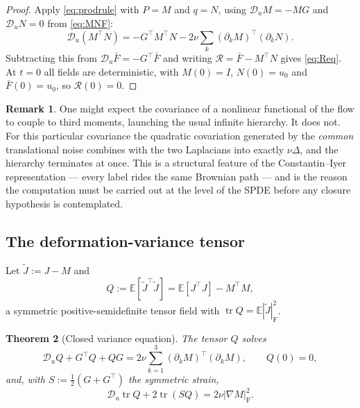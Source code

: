 \documentclass[11pt,reqno]{amsart}
\newcommand{\E}{\mathbb{E}}
\newcommand{\abs}[1]{\left\lvert #1\right\rvert}
\DeclareMathOperator{\tr}{tr}
\newtheorem{theorem}{Theorem}[section]
\theoremstyle{definition}
\newtheorem{remark}[theorem]{Remark}
\begin{document}
\begin{proof}
Apply \eqref{eq:prodrule} with $P=M$ and $q=N$, using $\mathcal D_uM=-MG$ and
$\mathcal D_uN=0$ from \eqref{eq:MNF}:
\[
  \mathcal D_u(M^\top N)=-G^\top M^\top N-2\nu\sum_k(\partial_kM)^\top(\partial_kN).
\]
Subtracting this from $\mathcal D_u\bar F=-G^\top\bar F$ and writing
$\mathcal R=\bar F-M^\top N$ gives \eqref{eq:Req}. At $t=0$ all fields are deterministic,
with $M(0)=I$, $N(0)=u_0$ and $\bar F(0)=u_0$, so $\mathcal R(0)=0$.
\end{proof}

\begin{remark}
One might expect the covariance of a nonlinear functional of the flow to couple to third
moments, launching the usual infinite hierarchy. It does not. For this particular
covariance the quadratic covariation generated by the \emph{common} translational noise
combines with the two Laplacians into exactly $\nu\Delta$, and the hierarchy terminates at
once. This is a structural feature of the Constantin--Iyer representation --- every label
rides the same Brownian path --- and is the reason the computation must be carried out at
the level of the SPDE before any closure hypothesis is contemplated.
\end{remark}

\subsection{The deformation-variance tensor}

Let $\widetilde J:=J-M$ and
\begin{equation}\label{eq:Qdef}
  Q:=\E[\widetilde J^\top\widetilde J]=\E[J^\top J]-M^\top M,
\end{equation}
a symmetric positive-semidefinite tensor field with
$\tr Q=\E\abs{\widetilde J}_{\mathrm F}^2$.

\begin{theorem}[Closed variance equation]\label{thm:Qeq}
The tensor $Q$ solves
\begin{equation}\label{eq:Qeq}
  \mathcal D_uQ+G^\top Q+QG=2\nu\sum_{k=1}^3(\partial_kM)^\top(\partial_kM),\qquad Q(0)=0,
\end{equation}
and, with $S:=\tfrac12(G+G^\top)$ the symmetric strain,
\begin{equation}\label{eq:trQ}
  \mathcal D_u\tr Q+2\tr(SQ)=2\nu\abs{\nabla M}_{\mathrm F}^2.
\end{equation}
\end{theorem}
\end{document}
